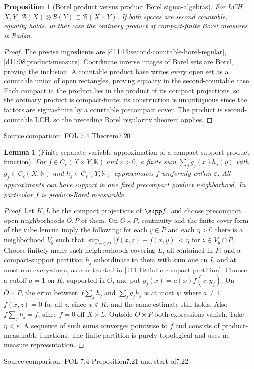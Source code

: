 \documentclass[11pt,oneside,openany]{book}
\newtheorem{lemma}[theorem]{Lemma}
\newtheorem{proposition}[theorem]{Proposition}
\theoremstyle{definition}
\theoremstyle{remark}
\newcommand{\eps}{\varepsilon}\newcommand{\ee}{\varepsilon}
\newcommand{\BB}{\mathcal B}\newcommand{\SSS}{\mathcal S}
\newcommand{\family}[1]{}
\newcommand{\source}[1]{\par\begingroup\small\sffamily\color{black!65}Source comparison: #1\par\endgroup}
\begin{document}
\begin{proposition}[Borel product versus product Borel sigma-algebras]\family{D11.18.product_borel_bridge}\label{d11:18:product-borel-bridge}
For LCH $X,Y$, $\BB(X)\otimes\BB(Y)\subset\BB(X\times Y)$. If both spaces are second countable, equality holds. In that case the ordinary product of compact-finite Borel measures is Radon.
\end{proposition}
\begin{proof}
The precise ingredients are \cref{d11:18:second-countable-borel-regular}, \cref{d11:08:product-measure}. Coordinate inverse images of Borel sets are Borel, proving the inclusion. A countable product base writes every open set as a countable union of open rectangles, proving equality in the second-countable case. Each compact in the product lies in the product of its compact projections, so the ordinary product is compact-finite; its construction is unambiguous since the factors are sigma-finite by a countable precompact cover. The product is second-countable LCH, so the preceding Borel regularity theorem applies.
\end{proof}
\source{FOL 7.4 Theorem7.20}

\begin{lemma}[Finite separate-variable approximation of a compact-support product function]\family{D11.18.cc_tensor_approximation}\label{d11:18:cc-tensor-approximation}
For $f\in C_c(X\times Y,\mathbb K)$ and $\eps>0$, a finite sum $\sum_jg_j(x)h_j(y)$ with $g_j\in C_c(X,\mathbb K)$ and $h_j\in C_c(Y,\mathbb K)$ approximates $f$ uniformly within $\eps$. All approximants can have support in one fixed precompact product neighborhood. In particular $f$ is product-Borel measurable.
\end{lemma}
\begin{proof}
Let $K,L$ be the compact projections of $\supp f$, and choose precompact open neighborhoods $O,P$ of them. On $\overline O\times\overline P$, continuity and the finite-cover form of the tube lemma imply the following: for each $y\in\overline P$ and each $\eta>0$ there is a neighborhood $V_y$ such that $\sup_{x\in\overline O}|f(x,z)-f(x,y)|<\eta$ for $z\in V_y\cap\overline P$. Choose finitely many such neighborhoods covering $L$, all contained in $P$, and a compact-support partition $h_j$ subordinate to them with sum one on $L$ and at most one everywhere, as constructed in \cref{d11:19:finite-compact-partition}. Choose a cutoff $a=1$ on $K$, supported in $O$, and put $g_j(x)=a(x)f(x,y_j)$. On $\overline O\times P$, the error between $f\sum_jh_j$ and $\sum_jg_jh_j$ is at most $\eta$: where $a\ne1$, $f(x,z)=0$ for all $z$, since $x\notin K$, and the same estimate still holds. Also $f\sum_jh_j=f$, since $f=0$ off $X\times L$. Outside $O\times P$ both expressions vanish. Take $\eta<\eps$. A sequence of such sums converges pointwise to $f$ and consists of product-measurable functions. The finite partition is purely topological and uses no measure representation.
\end{proof}
\source{FOL 7.4 Proposition7.21 and start of7.22}
\end{document}
